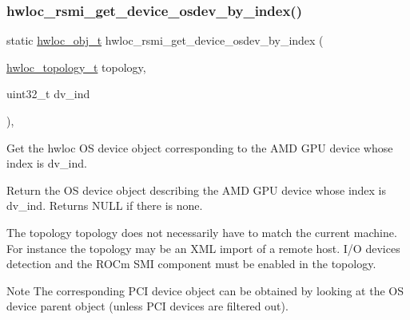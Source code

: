 \subsubsection{\texorpdfstring{hwloc\+\_\+rsmi\+\_\+get\+\_\+device\+\_\+osdev\+\_\+by\+\_\+index()}{hwloc\_rsmi\_get\_device\_osdev\_by\_index()}}
{\footnotesize\ttfamily static \hyperlink{a00185_ga79b8ab56877ef99ac59b833203391c7d}{hwloc\+\_\+obj\+\_\+t} hwloc\+\_\+rsmi\+\_\+get\+\_\+device\+\_\+osdev\+\_\+by\+\_\+index (\begin{DoxyParamCaption}\item[{\hyperlink{a00186_ga9d1e76ee15a7dee158b786c30b6a6e38}{hwloc\+\_\+topology\+\_\+t}}]{topology,  }\item[{uint32\+\_\+t}]{dv\+\_\+ind }\end{DoxyParamCaption})\hspace{0.3cm}{\ttfamily [inline]}, {\ttfamily [static]}}



Get the hwloc OS device object corresponding to the A\+MD G\+PU device whose index is {\ttfamily dv\+\_\+ind}. 

Return the OS device object describing the A\+MD G\+PU device whose index is {\ttfamily dv\+\_\+ind}. Returns N\+U\+LL if there is none.

The topology {\ttfamily topology} does not necessarily have to match the current machine. For instance the topology may be an X\+ML import of a remote host. I/O devices detection and the R\+O\+Cm S\+MI component must be enabled in the topology.

\begin{DoxyNote}{Note}
The corresponding P\+CI device object can be obtained by looking at the OS device parent object (unless P\+CI devices are filtered out). 
\end{DoxyNote}
